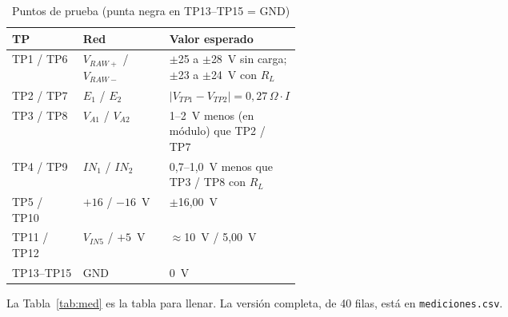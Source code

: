 \documentclass[conference]{IEEEtran}
\begin{document}
\begin{table}[htbp]
\caption{Puntos de prueba (punta negra en TP13--TP15 = GND)}
\label{tab:tp}
\centering
\footnotesize
\begin{tabular}{@{}llp{0.42\linewidth}@{}}
\toprule
TP & Red & Valor esperado \\
\midrule
TP1 / TP6 & $V_{RAW+}$ / $V_{RAW-}$ & $\pm$25 a $\pm$28~V sin carga; $\pm$23 a $\pm$24~V con $R_L$ \\
TP2 / TP7 & $E_1$ / $E_2$ & $|V_{TP1}-V_{TP2}|=0{,}27\,\Omega\cdot I$ \\
TP3 / TP8 & $V_{A1}$ / $V_{A2}$ & 1--2~V menos (en módulo) que TP2 / TP7 \\
TP4 / TP9 & $IN_1$ / $IN_2$ & 0,7--1,0~V menos que TP3 / TP8 con $R_L$ \\
TP5 / TP10 & $+16$ / $-16$~V & $\pm$16,00~V \\
TP11 / TP12 & $V_{IN5}$ / $+5$~V & $\approx$10~V / 5,00~V \\
TP13--TP15 & GND & 0~V \\
\bottomrule
\end{tabular}
\end{table}

La Tabla~\ref{tab:med} es la tabla para llenar. La versión completa, de 40 filas, está en \texttt{mediciones.csv}.
\end{document}

